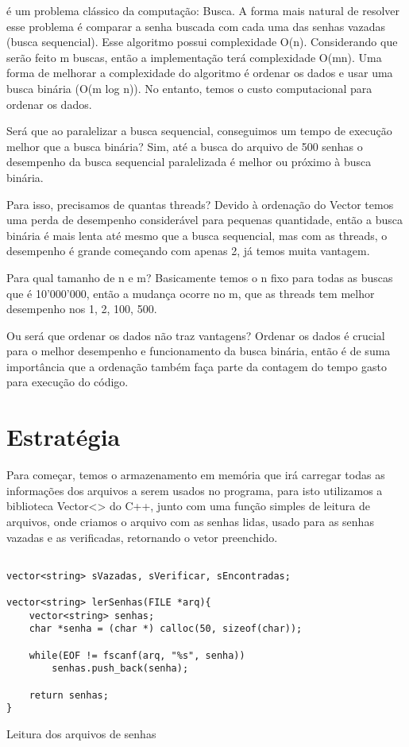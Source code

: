 \documentclass[10pt,journal,compsoc]{IEEEtran}
\begin{document}
 é um problema clássico da computação: Busca.
A forma mais natural de resolver esse problema é comparar a senha buscada com cada uma das senhas vazadas (busca sequencial). 
Esse algoritmo possui complexidade O(n). Considerando que serão feito m buscas, então a implementação terá complexidade O(mn).
Uma forma de melhorar a complexidade do algoritmo é ordenar os dados e usar uma busca binária (O(m log n)).
No entanto, temos o custo computacional para ordenar os dados.

Será que ao paralelizar a busca sequencial, conseguimos um tempo de execução melhor que a busca binária?
Sim, até a busca do arquivo de 500 senhas o desempenho da busca sequencial paralelizada é melhor ou próximo à busca binária.

Para isso, precisamos de quantas threads?
Devido à ordenação do Vector temos uma perda de desempenho considerável para pequenas quantidade, então a busca binária é mais lenta até mesmo que a busca sequencial, mas com as threads, o desempenho é grande começando com apenas 2, já temos muita vantagem.

Para qual tamanho de n e m?
Basicamente temos o n fixo para todas as buscas que é 10'000'000, então a mudança ocorre no m, que as threads tem melhor desempenho nos 1, 2, 100, 500. 
	
Ou será que ordenar os dados não traz vantagens?
Ordenar os dados é crucial para o melhor desempenho e funcionamento da busca binária, então é de suma importância que a ordenação também faça parte da contagem do tempo gasto para execução do código.


\section{Estratégia}
Para começar, temos o armazenamento em memória que irá carregar todas as informações dos arquivos a serem usados no programa, para isto utilizamos a biblioteca Vector<> do C++, junto com uma função simples de leitura de arquivos, onde criamos o arquivo com as senhas lidas, usado para as senhas vazadas e as verificadas, retornando o vetor preenchido.

\begin{listing}[ht]
\begin{verbatim}

vector<string> sVazadas, sVerificar, sEncontradas;

vector<string> lerSenhas(FILE *arq){
    vector<string> senhas;
    char *senha = (char *) calloc(50, sizeof(char));

    while(EOF != fscanf(arq, "%s", senha)) 
        senhas.push_back(senha);

	return senhas;
}
\end{verbatim}
\caption{Leitura dos arquivos de senhas}
\label{listing:1}
\end{listing}
\end{document}
